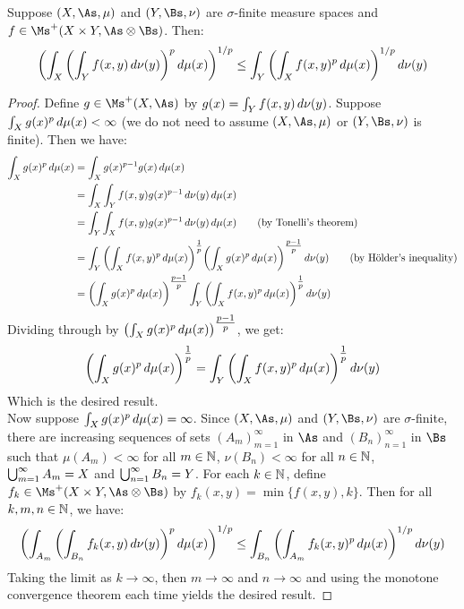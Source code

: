 \documentclass[main.tex]{subfiles}
\begin{document}
\begin{theorem}\label{minkowskis_inequality_for_integrals}
    Suppose $(X,\As,\mu)$ and $(Y,\Bs,\nu)$ are $\sigma$-finite measure spaces and $f\in\Ms^+(X\times Y,\As\otimes\Bs)$. Then:
    \begin{equation*}
        \qty(\int_X \qty(\int_Y f(x,y)\,d\nu(y))^p\,d\mu(x))^{1/p}
        \le \int_Y \qty(\int_X f(x,y)^p\,d\mu(x))^{1/p}\,d\nu(y)
    \end{equation*}
\end{theorem}
\begin{proof}
    Define $g\in\Ms^+(X,\As)$ by $g(x)= \int_Y f(x,y)\,d\nu(y)$. Suppose $\int_X g(x)^p\,d\mu(x)<\infty$ (we do not need to assume $(X,\As,\mu)$ or $(Y,\Bs,\nu)$ is finite). Then we have:
    \begin{align*}
        \int_X g(x)^p\,d\mu(x)
        &= \int_X g(x)^{p-1}g(x)\,d\mu(x) \\
        &= \int_X \int_Y f(x,y)g(x)^{p-1}\,d\nu(y)\,d\mu(x) \\
        &= \int_Y \int_X f(x,y)g(x)^{p-1}\,d\nu(y)\,d\mu(x) \tag{by Tonelli's theorem} \\
        &= \int_Y \qty(\int_X f(x,y)^p\,d\mu(x))^{\tfrac{1}{p}} \qty(\int_X g(x)^{p}\,d\mu(x))^{\tfrac{p-1}{p}}\,d\nu(y) \tag{by Hölder's inequality} \\
        &= \qty(\int_X g(x)^{p}\,d\mu(x))^{\tfrac{p-1}{p}} \int_Y \qty(\int_X f(x,y)^p\,d\mu(x))^{\tfrac{1}{p}}\,d\nu(y)
    \end{align*}
    Dividing through by $\qty(\int_X g(x)^{p}\,d\mu(x))^{\tfrac{p-1}{p}}$, we get:
    \begin{equation*}
        \qty(\int_X g(x)^{p}\,d\mu(x))^{\tfrac{1}{p}}
        = \int_Y \qty(\int_X f(x,y)^p\,d\mu(x))^{\tfrac{1}{p}}\,d\nu(y)
    \end{equation*}
    Which is the desired result.\\
    
    Now suppose $\int_X g(x)^p\,d\mu(x)= \infty$. Since $(X,\As,\mu)$ and $(Y,\Bs,\nu)$ are $\sigma$-finite, there are increasing sequences of sets $(A_m)_{m=1}^\infty$ in $\As$ and $(B_n)_{n=1}^\infty$ in $\Bs$ such that $\mu(A_m)<\infty$ for all $m\in\N$, $\nu(B_n)<\infty$ for all $n\in\N$, $\bigcup_{m=1}^\infty A_m=X$ and $\bigcup_{n=1}^\infty B_n=Y$. For each $k\in\N$, define $f_k\in\Ms^+(X\times Y,\As\otimes\Bs)$ by $f_k(x,y)= \min\{f(x,y),k\}$. Then for all $k,m,n\in\N$, we have:
    \begin{equation*}
        \qty(\int_{A_m} \qty(\int_{B_n} f_k(x,y)\,d\nu(y))^p\,d\mu(x))^{1/p}
        \le \int_{B_n} \qty(\int_{A_m} f_k(x,y)^p\,d\mu(x))^{1/p}\,d\nu(y)
    \end{equation*}
    Taking the limit as $k\to\infty$, then $m\to\infty$ and $n\to\infty$ and using the monotone convergence theorem each time yields the desired result.
\end{proof}
\end{document}
